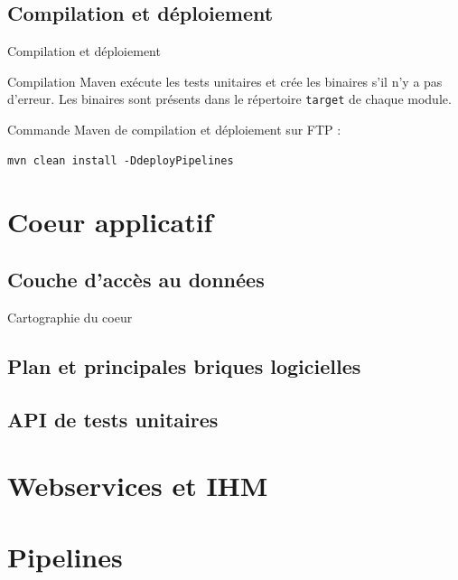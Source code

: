 \documentclass[compact]{beamer}%
\begin{document}
\subsection{Compilation et déploiement}

\begin{frame}{Compilation et déploiement}

	\begin{block}{Compilation}
	Maven exécute les tests unitaires et crée les binaires s'il n'y a pas d'erreur. Les binaires sont présents dans le répertoire \texttt{target} de chaque module.
	\end{block}
	
	\pause
	Commande Maven de compilation et déploiement sur FTP :
	\begin{lstlisting}
mvn clean install -DdeployPipelines
	\end{lstlisting}

\end{frame}


\section{Coeur applicatif}

\subsection{Couche d'accès au données}

\begin{frame}{Cartographie du coeur}

\end{frame}

\subsection{Plan et principales briques logicielles}

\subsection{API de tests unitaires}

\section{Webservices et IHM}


\section{Pipelines}

\end{document}
